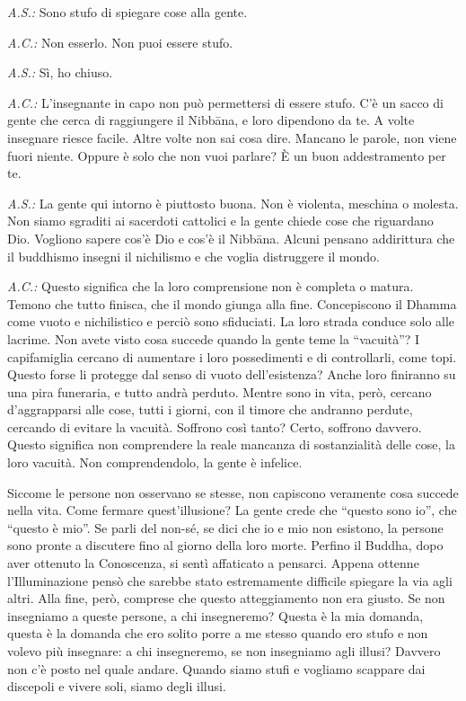 \emph{A.S.:} Sono stufo di spiegare cose alla gente.

\emph{A.C.:} Non esserlo. Non puoi essere stufo.

\emph{A.S.:} Sì, ho chiuso.

\emph{A.C.:} L'insegnante in capo non può permettersi di essere stufo. C'è un
sacco di gente che cerca di raggiungere il Nibbāna, e loro
dipendono da te. A volte insegnare riesce facile. Altre volte non sai
cosa dire. Mancano le parole, non viene fuori niente. Oppure è solo che
non vuoi parlare? È un buon addestramento per te.

\emph{A.S.:} La gente qui intorno è piuttosto buona. Non è violenta, meschina o
molesta. Non siamo sgraditi ai sacerdoti cattolici e la gente chiede
cose che riguardano Dio. Vogliono sapere cos'è Dio e cos'è il
Nibbāna. Alcuni pensano addirittura che il buddhismo insegni il
nichilismo e che voglia distruggere il mondo.

\emph{A.C.:} Questo significa che la loro comprensione non è completa o matura.
Temono che tutto finisca, che il mondo giunga alla fine. Concepiscono il
Dhamma come vuoto e nichilistico e perciò sono sfiduciati. La loro
strada conduce solo alle lacrime. Non avete visto cosa succede quando la
gente teme la ``vacuità''? I capifamiglia cercano di aumentare i loro
possedimenti e di controllarli, come topi. Questo forse li protegge dal
senso di vuoto dell'esistenza? Anche loro finiranno su una pira
funeraria, e tutto andrà perduto. Mentre sono in vita, però, cercano
d'aggrapparsi alle cose, tutti i giorni, con il timore che andranno
perdute, cercando di evitare la vacuità. Soffrono così tanto? Certo,
soffrono davvero. Questo significa non comprendere la reale mancanza di
sostanzialità delle cose, la loro vacuità. Non comprendendolo, la gente
è infelice.

Siccome le persone non osservano se stesse, non capiscono veramente cosa
succede nella vita. Come fermare quest'illusione? La gente crede che
``questo sono io'', che ``questo è mio''. Se parli del non-sé, se dici
che io e mio non esistono, la persone sono pronte a discutere fino al
giorno della loro morte. Perfino il Buddha, dopo aver ottenuto la
Conoscenza, si sentì affaticato a pensarci. Appena ottenne
l'Illuminazione pensò che sarebbe stato estremamente difficile spiegare
la via agli altri. Alla fine, però, comprese che questo atteggiamento
non era giusto. Se non insegniamo a queste persone, a chi insegneremo?
Questa è la mia domanda, questa è la domanda che ero solito porre a me
stesso quando ero stufo e non volevo più insegnare: a chi insegneremo,
se non insegniamo agli illusi? Davvero non c'è posto nel quale andare.
Quando siamo stufi e vogliamo scappare dai discepoli e vivere soli,
siamo degli illusi.

